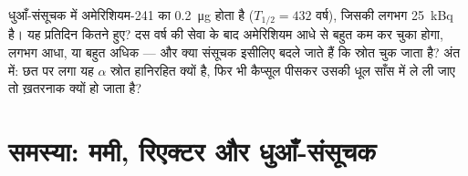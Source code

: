 \begin{exercise}[$\star\star\star$]\label{exo:g11:nucleus-radioactivity:15}
धुआँ-संसूचक में अमेरिशियम-241 का \qty{0.2}{\micro\gram} होता है ($T_{1/2} = 432$ वर्ष), जिसकी
 लगभग \qty{25}{kBq} है। यह प्रतिदिन कितने  हुए? दस वर्ष की
सेवा के बाद अमेरिशियम आधे से बहुत कम  कर चुका होगा, लगभग आधा, या बहुत
अधिक --- और क्या संसूचक इसीलिए बदले जाते हैं कि स्रोत चुक जाता है? अंत में:
छत पर लगा यह $\alpha$ स्रोत हानिरहित क्यों है, फिर भी कैप्सूल पीसकर उसकी धूल
साँस में ले ली जाए तो ख़तरनाक क्यों हो जाता है?
\end{exercise}

\section{समस्या: ममी, रिएक्टर और धुआँ-संसूचक}

